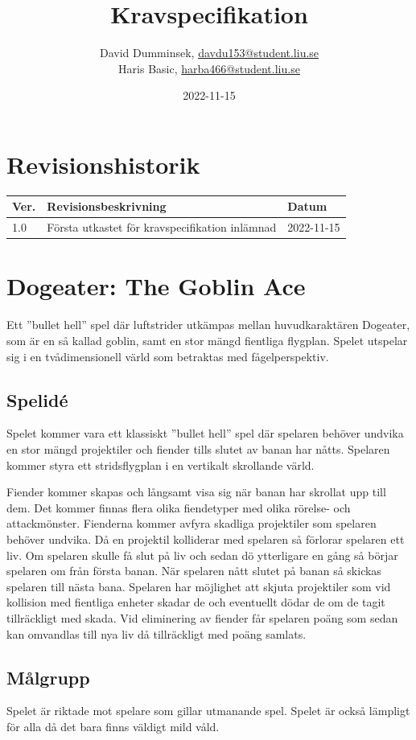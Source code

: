 \documentclass{TDP005mall}
\author{David Dumminsek, \url{davdu153@student.liu.se}\\
  Haris Basic, \url{harba466@student.liu.se}\\
  }
\title{Kravspecifikation}
\date{2022-11-15}
\begin{document}
\projectpage
\section{Revisionshistorik}
\begin{table}[!h]
\begin{tabularx}{\linewidth}{|l|X|l|}
\hline
Ver. & Revisionsbeskrivning & Datum \\\hline
1.0 & Första utkastet för kravspecifikation inlämnad & 2022-11-15 \\\hline
\end{tabularx}
\end{table}

\section{Dogeater: The Goblin Ace}

Ett ''bullet hell'' spel där luftstrider utkämpas mellan huvudkaraktären Dogeater, som är en så kallad goblin, samt en stor mängd fientliga flygplan.
Spelet utspelar sig i en tvådimensionell värld som betraktas med fågelperspektiv.

\subsection{Spelidé}
Spelet kommer vara ett klassiskt ''bullet hell'' spel där spelaren behöver undvika en stor mängd projektiler och fiender tills slutet av banan har nåtts. 
Spelaren kommer styra ett stridsflygplan i en vertikalt skrollande värld.

Fiender kommer skapas och långsamt visa sig när banan har skrollat upp till dem. Det kommer finnas flera olika fiendetyper med olika rörelse- och attackmönster. 
Fienderna kommer avfyra skadliga projektiler som spelaren behöver undvika. Då en projektil kolliderar med spelaren så förlorar spelaren ett liv.
Om spelaren skulle få slut på liv och sedan dö ytterligare en gång så börjar spelaren om från första banan.
När spelaren nått slutet på banan så skickas spelaren till nästa bana.
Spelaren har möjlighet att skjuta projektiler som vid kollision med fientliga enheter skadar de och eventuellt dödar de om de tagit tillräckligt med skada.
Vid eliminering av fiender får spelaren poäng som sedan kan omvandlas till nya liv då tillräckligt med poäng samlats.

\subsection{Målgrupp}
Spelet är riktade mot spelare som gillar utmanande spel.
Spelet är också lämpligt för alla då det bara finns väldigt mild våld.
\end{document}
